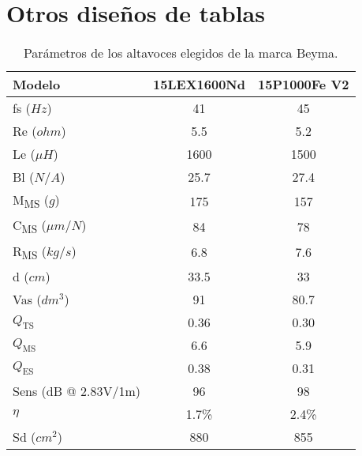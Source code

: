 \section{Otros diseños de tablas}

\begin{table}[ht]
	\centering
	{
	\begin{tabular}{@{}lcc@{}}
	\toprule
	Modelo			& 	15LEX1600Nd	&	15P1000Fe V2	 	\\ \midrule
	fs ($Hz$)		& 	41          & 	45           	\\
	Re ($ohm$)		& 5.5         	& 5.2         	 	\\
	Le ($\mu H$)	& 1600        	& 1500         		\\
	Bl ($N/A$)		& 25.7        	& 27.4         		\\
	M\textsubscript{MS} ($g$)		& 175	& 157		\\
	C\textsubscript{MS} ($\mu m/N$)	& 84		& 78			\\
	R\textsubscript{MS} ($kg/s$)		& 6.8 	& 7.6   	 	\\
	d ($cm$)		& 33.5			& 33           		\\
	Vas ($dm^3$)   	& 91          	& 80.7         		\\
	$Q_\text{TS}$  	& 0.36        	& 0.30         		\\
	$Q_\text{MS}$  	& 6.6         	& 5.9          		\\
	$Q_\text{ES}$  	& 0.38        	& 0.31         		\\
	Sens (dB @ 2.83V/1m) & 96      	& 98           		\\
	$\eta$          & 1.7\%       	& 2.4\%        		\\
	Sd ($cm^2$)   	& 880         	& 855          		\\ \bottomrule
	\end{tabular}
	}
	\caption{Parámetros de los altavoces elegidos de la marca Beyma\textsuperscript{\tiny\textregistered}.}
	\label{tablaparametros}
\end{table}






